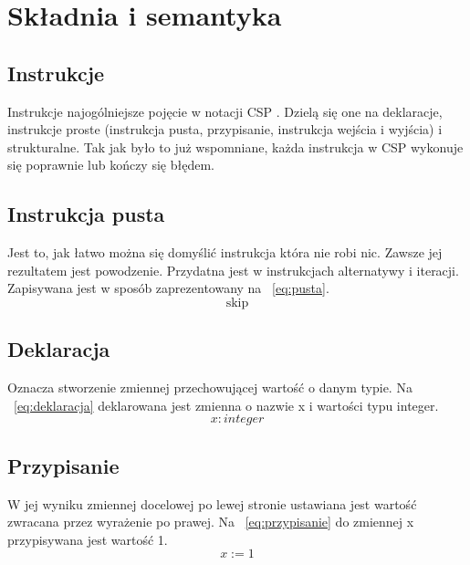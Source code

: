 \documentclass[a4paper]{report}
\begin{document}
  \chapter{Składnia i semantyka}

  \section{Instrukcje}
  Instrukcje najogólniejsze pojęcie w notacji CSP .
  Dzielą się one na deklaracje, instrukcje proste (instrukcja pusta, przypisanie, instrukcja wejścia i wyjścia) i strukturalne.
  Tak jak było to już wspomniane, każda instrukcja w CSP wykonuje się poprawnie lub kończy się błędem.

  \section{Instrukcja pusta}
  Jest to, jak łatwo można się domyślić instrukcja która nie robi nic.
  Zawsze jej rezultatem jest powodzenie.
  Przydatna jest w instrukcjach alternatywy i iteracji.
  Zapisywana jest w sposób zaprezentowany na ~\ref{eq:pusta}.
  \begin{equation}
    \label{eq:pusta}
    \text{skip}
  \end{equation}

  \section{Deklaracja}
  Oznacza stworzenie zmiennej przechowującej wartość o danym typie.
  Na ~\ref{eq:deklaracja} deklarowana jest zmienna o nazwie x i wartości typu integer.
  \begin{equation}
    \label{eq:deklaracja}
    x: integer
  \end{equation}

  \section{Przypisanie}
  W jej wyniku zmiennej docelowej po lewej stronie ustawiana jest wartość zwracana przez wyrażenie po prawej.
  Na ~\ref{eq:przypisanie} do zmiennej x przypisywana jest wartość 1.
  \begin{equation}
    \label{eq:przypisanie}
    x := 1
  \end{equation}
\end{document}
